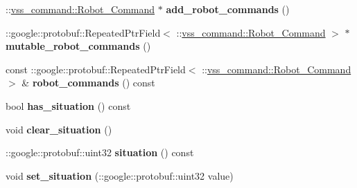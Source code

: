 \begin{DoxyCompactItemize}
\item 
\+::\hyperlink{classvss__command_1_1Robot__Command}{vss\+\_\+command\+::\+Robot\+\_\+\+Command} $\ast$ {\bfseries add\+\_\+robot\+\_\+commands} ()\hypertarget{classvss__command_1_1Global__Commands_add6abc22ca67ffa146cfba3e0b17ad2b}{}\label{classvss__command_1_1Global__Commands_add6abc22ca67ffa146cfba3e0b17ad2b}

\item 
\+::google\+::protobuf\+::\+Repeated\+Ptr\+Field$<$ \+::\hyperlink{classvss__command_1_1Robot__Command}{vss\+\_\+command\+::\+Robot\+\_\+\+Command} $>$ $\ast$ {\bfseries mutable\+\_\+robot\+\_\+commands} ()\hypertarget{classvss__command_1_1Global__Commands_a3de88f16ed28f63fed38eff2ef169df4}{}\label{classvss__command_1_1Global__Commands_a3de88f16ed28f63fed38eff2ef169df4}

\item 
const \+::google\+::protobuf\+::\+Repeated\+Ptr\+Field$<$ \+::\hyperlink{classvss__command_1_1Robot__Command}{vss\+\_\+command\+::\+Robot\+\_\+\+Command} $>$ \& {\bfseries robot\+\_\+commands} () const \hypertarget{classvss__command_1_1Global__Commands_acb14464615fbad56ce9a1da3ce46373a}{}\label{classvss__command_1_1Global__Commands_acb14464615fbad56ce9a1da3ce46373a}

\item 
bool {\bfseries has\+\_\+situation} () const \hypertarget{classvss__command_1_1Global__Commands_a8ef03dbd77af5f6170759b71949c50c2}{}\label{classvss__command_1_1Global__Commands_a8ef03dbd77af5f6170759b71949c50c2}

\item 
void {\bfseries clear\+\_\+situation} ()\hypertarget{classvss__command_1_1Global__Commands_a7117b4a642bd8d833e6a431073efc94d}{}\label{classvss__command_1_1Global__Commands_a7117b4a642bd8d833e6a431073efc94d}

\item 
\+::google\+::protobuf\+::uint32 {\bfseries situation} () const \hypertarget{classvss__command_1_1Global__Commands_a712002b02d4d401a76479434fd97dc17}{}\label{classvss__command_1_1Global__Commands_a712002b02d4d401a76479434fd97dc17}

\item 
void {\bfseries set\+\_\+situation} (\+::google\+::protobuf\+::uint32 value)\hypertarget{classvss__command_1_1Global__Commands_a8d96bc1eeac62f3e318c258bfea74258}{}\label{classvss__command_1_1Global__Commands_a8d96bc1eeac62f3e318c258bfea74258}

\end{DoxyCompactItemize}
